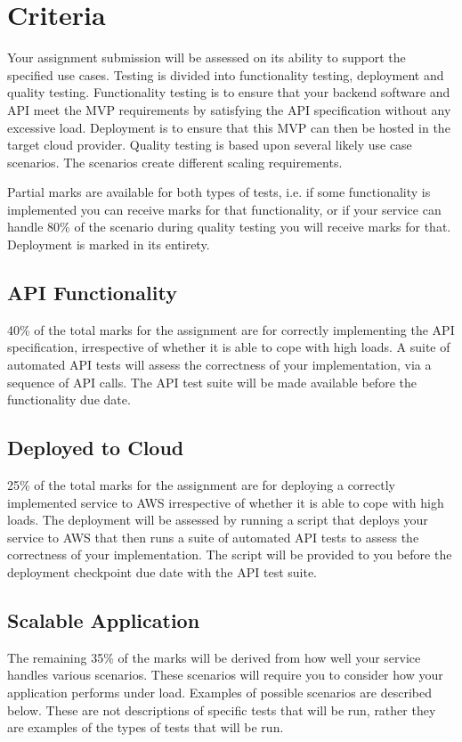 \documentclass{csse4400}
\begin{document}
\section{Criteria}
Your assignment submission will be assessed on its ability to support the specified use cases. Testing is divided into functionality testing, deployment and quality testing. Functionality testing is to ensure that your backend software and API meet the MVP requirements by satisfying the API specification without any excessive load. Deployment is to ensure that this MVP can then be hosted in the target cloud provider. Quality testing is based upon several likely use case scenarios. The scenarios create different scaling requirements.

Partial marks are available for both types of tests, i.e. if some functionality is implemented you can receive marks for that functionality, or if your service can handle 80\% of the scenario during quality testing you will receive marks for that. Deployment is marked in its entirety.

\subsection{API Functionality} %
40\% of the total marks for the assignment are for correctly implementing the API specification, irrespective of whether it is able to cope with high loads. A suite of automated API tests will assess the correctness of your implementation, via a sequence of API calls. The API test suite will be made available before the functionality due date.

\subsection{Deployed to Cloud} %
25\% of the total marks for the assignment are for deploying a correctly implemented service to AWS irrespective of whether it is able to cope with high loads. The deployment will be assessed by running a script that deploys your service to AWS that then runs a suite of automated API tests to assess the correctness of your implementation. The script will be provided to you before the deployment checkpoint due date with the API test suite.

\subsection{Scalable Application}\label{sec:scenarios} %
The remaining 35\% of the marks will be derived from how well your service handles various scenarios. These scenarios will require you to consider how your application performs under load. Examples of possible scenarios are described below. These are not descriptions of specific tests that will be run, rather they are examples of the types of tests that will be run.
\end{document}
